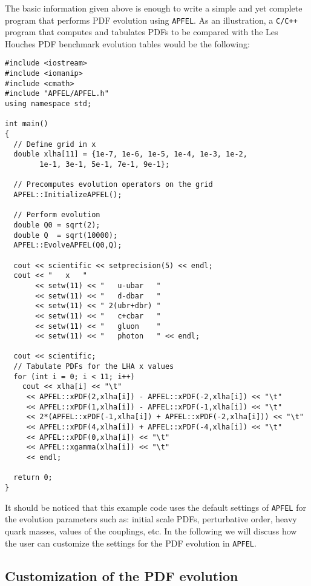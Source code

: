 \documentclass[11pt,a4paper]{article}
\begin{document}
The basic information given above is enough to write a simple and yet
complete program that performs PDF evolution using {\tt APFEL}.
%
As an illustration, a {\tt C/C++} program that computes and tabulates
PDFs to be compared with the Les Houches PDF benchmark evolution
tables would be the following:
\begin{lstlisting}
#include <iostream>
#include <iomanip>
#include <cmath>
#include "APFEL/APFEL.h"
using namespace std;

int main()
{
  // Define grid in x
  double xlha[11] = {1e-7, 1e-6, 1e-5, 1e-4, 1e-3, 1e-2, 
		1e-1, 3e-1, 5e-1, 7e-1, 9e-1};
  
  // Precomputes evolution operators on the grid
  APFEL::InitializeAPFEL();

  // Perform evolution
  double Q0 = sqrt(2);
  double Q  = sqrt(10000);
  APFEL::EvolveAPFEL(Q0,Q);

  cout << scientific << setprecision(5) << endl;
  cout << "   x   " 
       << setw(11) << "   u-ubar   " 
       << setw(11) << "   d-dbar   " 
       << setw(11) << " 2(ubr+dbr) " 
       << setw(11) << "   c+cbar   " 
       << setw(11) << "   gluon    " 
       << setw(11) << "   photon   " << endl;

  cout << scientific;
  // Tabulate PDFs for the LHA x values
  for (int i = 0; i < 11; i++)
    cout << xlha[i] << "\t"  
	 << APFEL::xPDF(2,xlha[i]) - APFEL::xPDF(-2,xlha[i]) << "\t"
	 << APFEL::xPDF(1,xlha[i]) - APFEL::xPDF(-1,xlha[i]) << "\t"
	 << 2*(APFEL::xPDF(-1,xlha[i]) + APFEL::xPDF(-2,xlha[i])) << "\t"
	 << APFEL::xPDF(4,xlha[i]) + APFEL::xPDF(-4,xlha[i]) << "\t"
	 << APFEL::xPDF(0,xlha[i]) << "\t"
	 << APFEL::xgamma(xlha[i]) << "\t"
	 << endl;

  return 0;
}
\end{lstlisting}
It should be noticed that this example code uses the default settings
of {\tt APFEL} for the evolution parameters such as: initial scale
PDFs, perturbative order, heavy quark masses, values of the couplings,
etc. In the following we will discuss how the user can customize the
settings for the PDF evolution in {\tt APFEL}.

\subsection{Customization of the PDF evolution}\label{EvolCustom}
\end{document}
